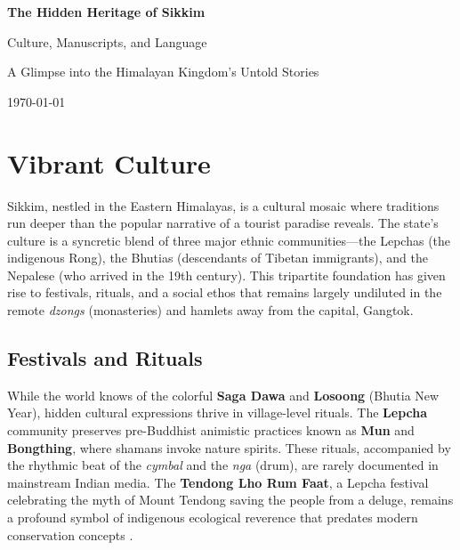 \documentclass[12pt]{article}
\begin{document}
\begin{titlepage}
    \centering
    \vspace*{2cm}
    {\Huge\bfseries\color{sikkimRed} The Hidden Heritage of Sikkim\par}
    \vspace{1cm}
    {\Large Culture, Manuscripts, and Language\par}
    \vspace{2cm}
    {\large A Glimpse into the Himalayan Kingdom's Untold Stories\par}
    \vspace{3cm}
    {\today\par}
\end{titlepage}

\tableofcontents
\newpage

\section{Vibrant Culture}
Sikkim, nestled in the Eastern Himalayas, is a cultural mosaic where traditions run deeper than the popular narrative of a tourist paradise reveals. The state's culture is a syncretic blend of three major ethnic communities—the Lepchas (the indigenous Rong), the Bhutias (descendants of Tibetan immigrants), and the Nepalese (who arrived in the 19th century). This tripartite foundation has given rise to festivals, rituals, and a social ethos that remains largely undiluted in the remote \textit{dzongs} (monasteries) and hamlets away from the capital, Gangtok.

\subsection{Festivals and Rituals}
While the world knows of the colorful \textbf{Saga Dawa} and \textbf{Losoong} (Bhutia New Year), hidden cultural expressions thrive in village-level rituals. The \textbf{Lepcha} community preserves pre-Buddhist animistic practices known as \textbf{Mun} and \textbf{Bongthing}, where shamans invoke nature spirits. These rituals, accompanied by the rhythmic beat of the \textit{cymbal} and the \textit{nga} (drum), are rarely documented in mainstream Indian media. The \textbf{Tendong Lho Rum Faat}, a Lepcha festival celebrating the myth of Mount Tendong saving the people from a deluge, remains a profound symbol of indigenous ecological reverence that predates modern conservation concepts \cite{siiger1978}.
\end{document}
